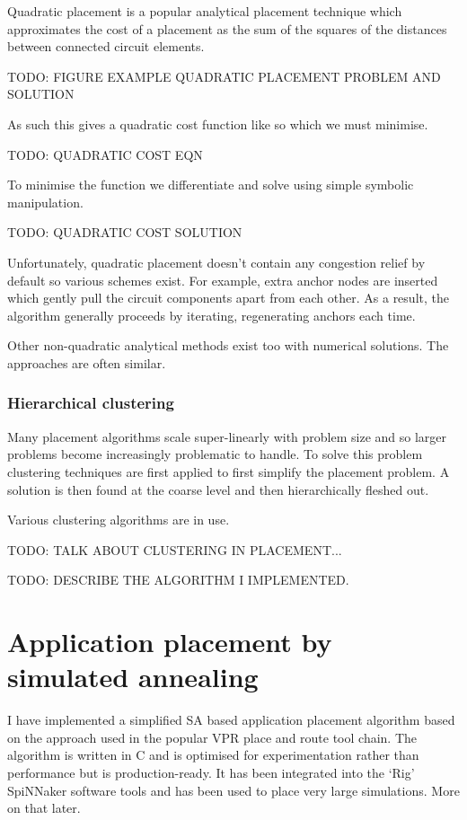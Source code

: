 				Quadratic placement is a popular analytical placement technique which
				approximates the cost of a placement as the sum of the squares of the
				distances between connected circuit elements.
				
				TODO: FIGURE EXAMPLE QUADRATIC PLACEMENT PROBLEM AND SOLUTION
				
				As such this gives a quadratic cost function like so which we must
				minimise.
				
				TODO: QUADRATIC COST EQN
				
				To minimise the function we differentiate and solve using simple
				symbolic manipulation.
				
				TODO: QUADRATIC COST SOLUTION
				
				Unfortunately, quadratic placement doesn't contain any congestion
				relief by default so various schemes exist. For example, extra anchor
				nodes are inserted which gently pull the circuit components apart from
				each other. As a result, the algorithm generally proceeds by iterating,
				regenerating anchors each time.
				
				Other non-quadratic analytical methods exist too with numerical
				solutions. The approaches are often similar.
			
			\subsubsection{Hierarchical clustering}
				
				Many placement algorithms scale super-linearly with problem size and so
				larger problems become increasingly problematic to handle. To solve
				this problem clustering techniques are first applied to first simplify
				the placement problem. A solution is then found at the coarse level and
				then hierarchically fleshed out.
				
				Various clustering algorithms are in use.
				
				TODO: TALK ABOUT CLUSTERING IN PLACEMENT...
				
				TODO: DESCRIBE THE ALGORITHM I IMPLEMENTED.
	
	\section{Application placement by simulated annealing}
		
		\label{sec:placement-by-annealing}	
		
		I have implemented a simplified SA based application placement algorithm
		based on the approach used in the popular VPR place and route tool chain.
		The algorithm is written in C and is optimised for experimentation rather
		than performance but is production-ready. It has been integrated into the
		`Rig' SpiNNaker software tools and has been used to place very large
		simulations. More on that later.
		
